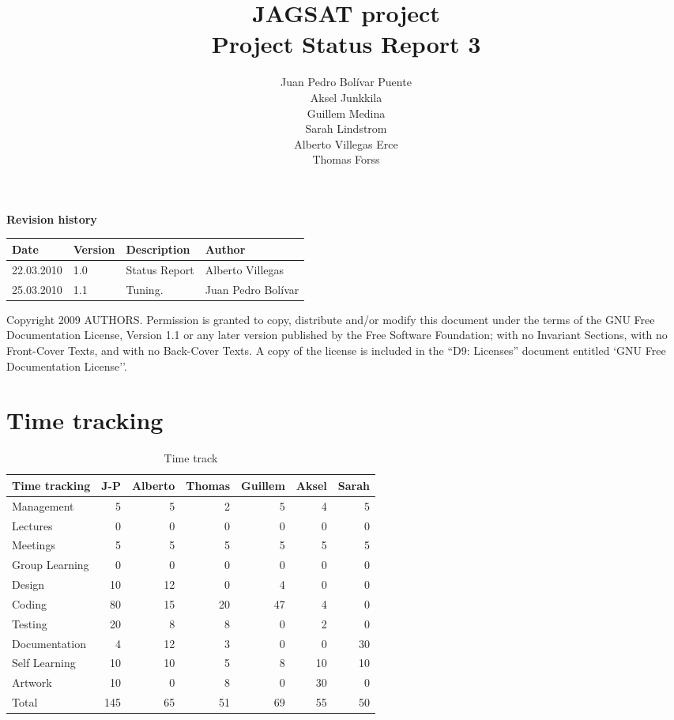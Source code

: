 \documentclass[12pt,a4paper]{article}
\title{\large JAGSAT project\\\huge Project Status Report 3}
\author{
  Juan Pedro Bolívar Puente\\ 
  Aksel Junkkila\\
  Guillem Medina\\ 
  Sarah Lindstrom\\ 
  Alberto Villegas Erce\\ 
  Thomas Forss
}
\begin{document}
\maketitle

\begin{center}
\textbf{Revision history}

\begin{tabular}{ l | l | l | l }
Date			&Version	&Description		&Author\\\hline\hline
22.03.2010	&1.0		&Status Report		&Alberto
Villegas\\
25.03.2010	&1.1		&Tuning.		&Juan Pedro Bolívar
\end{tabular}
\label{tab:rev}
\end{center}

\vfill
Copyright 2009 AUTHORS.
Permission is granted to copy, distribute and/or modify this document under the terms of the GNU Free Documentation License, Version 1.1 or any later version published by the Free Software Foundation;  with no Invariant Sections, with no Front-Cover Texts, and with no Back-Cover Texts. A copy of the license is included in the ``D9: Licenses''  document entitled `GNU Free Documentation License''.

\pagebreak
\tableofcontents
\pagebreak

\section{Time tracking}

\begin{table}[h!]
\small
\begin{tabular}{ l | r | r | r | r | r | r}
Time tracking    &J-P  &Alberto &Thomas &Guillem &Aksel &Sarah\\\hline\hline
Management       &5    &5       &2      &5       &4     &5\\
Lectures         &0    &0       &0      &0       &0     &0\\
Meetings         &5    &5       &5      &5       &5     &5\\
Group Learning   &0    &0       &0      &0       &0     &0\\
Design           &10   &12      &0      &4       &0     &0\\
Coding           &80   &15      &20     &47      &4     &0\\
Testing          &20   &8       &8      &0       &2     &0\\
Documentation    &4    &12      &3      &0       &0     &30\\
Self Learning    &10   &10      &5      &8       &10    &10\\
Artwork          &10   &0       &8      &0       &30    &0\\
Total            &145  &65      &51     &69      &55    &50
\end{tabular}
\caption{Time track}
\label{tab:timetrack}
\end{table}
\end{document}
